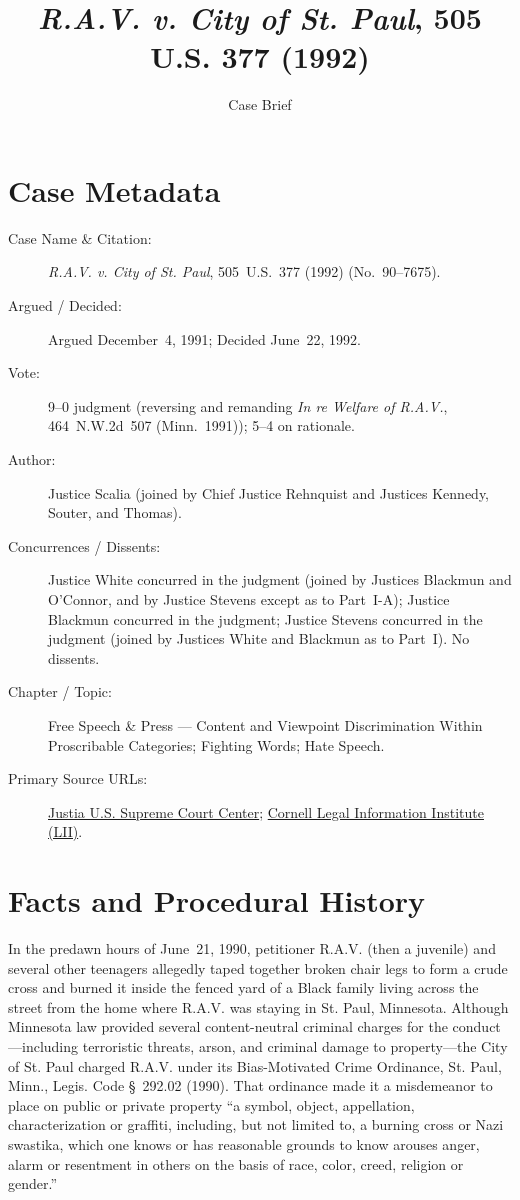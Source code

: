\documentclass[12pt]{article}
\title{\textit{R.A.V. v. City of St. Paul}, 505 U.S. 377 (1992)}
\author{Case Brief}
\date{}
\begin{document}
\maketitle


\section{Case Metadata}
\begin{description}
  \item[Case Name \& Citation:] \textit{R.A.V. v. City of St. Paul}, 505~U.S.~377 (1992) (No.~90--7675).
  \item[Argued / Decided:] Argued December~4, 1991; Decided June~22, 1992.
  \item[Vote:] 9--0 judgment (reversing and remanding \textit{In re Welfare of R.A.V.}, 464~N.W.2d~507 (Minn.~1991)); 5--4 on rationale.
  \item[Author:] Justice Scalia (joined by Chief Justice Rehnquist and Justices Kennedy, Souter, and Thomas).
  \item[Concurrences / Dissents:] Justice White concurred in the judgment (joined by Justices Blackmun and O'Connor, and by Justice Stevens except as to Part~I-A); Justice Blackmun concurred in the judgment; Justice Stevens concurred in the judgment (joined by Justices White and Blackmun as to Part~I). No dissents.
  \item[Chapter / Topic:] Free Speech \& Press --- Content and Viewpoint Discrimination Within Proscribable Categories; Fighting Words; Hate Speech.
  \item[Primary Source URLs:] \href{https://supreme.justia.com/cases/federal/us/505/377/}{Justia U.S. Supreme Court Center}; \href{https://www.law.cornell.edu/supremecourt/text/90-7675}{Cornell Legal Information Institute (LII)}.
\end{description}

\section{Facts and Procedural History}
In the predawn hours of June~21, 1990, petitioner R.A.V. (then a juvenile) and several other teenagers allegedly taped together broken chair legs to form a crude cross and burned it inside the fenced yard of a Black family living across the street from the home where R.A.V. was staying in St. Paul, Minnesota. Although Minnesota law provided several content-neutral criminal charges for the conduct---including terroristic threats, arson, and criminal damage to property---the City of St. Paul charged R.A.V. under its Bias-Motivated Crime Ordinance, St. Paul, Minn., Legis. Code \S~292.02 (1990). That ordinance made it a misdemeanor to place on public or private property ``a symbol, object, appellation, characterization or graffiti, including, but not limited to, a burning cross or Nazi swastika, which one knows or has reasonable grounds to know arouses anger, alarm or resentment in others on the basis of race, color, creed, religion or gender.''
\end{document}

